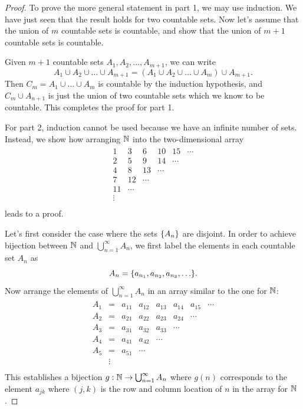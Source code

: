 \documentclass[11pt,twoside=off,numbers=noenddot]{scrbook}
\begin{document}
\begin{proof}
  To prove the more general statement in part 1, we may use
  induction. We have just seen that the result holds for two
  countable sets. Now let's assume that the union of $m$ countable
  sets is countable, and show that the union of $m + 1$ countable
  sets is countable.

  Given $m + 1$ countable sets $A_1, A_2, \dots, A_{m + 1}$, we can write
  \[ A_1 \cup A_2 \cup \dots \cup A_{m + 1} = (A_1 \cup A_2 \cup
  \dots \cup A_m) \cup A_{m + 1}. \]
  Then $C_m = A_1 \cup \dots \cup A_m$ is countable by the induction
  hypothesis, and $C_m \cup A_{n + 1}$ is just the union of two
  countable sets which we know to be countable. This completes the
  proof for part 1.

  For part 2, induction cannot be used because we have an infinite
  number of sets. Instead, we show how arranging $\mathbb N$ into the
  two-dimensional array
  \begin{align*}
    \begin{array}{cccccc}
      1  & 3  & 6  & 10 & 15 & \cdots \\
      2  & 5  & 9  & 14 & \cdots \\
      4  & 8  & 13 & \cdots \\
      7  & 12 & \cdots \\
      11 & \cdots \\
      \vdots \\
    \end{array}
  \end{align*}
  leads to a proof.

  Let's first consider the case where the sets $\{ A_n \}$ are
  disjoint. In order to achieve bijection between $\mathbb N$ and
  $\bigcup_{n = 1}^{\infty} A_n$, we first label the elements in each
  countable set $A_n$ as
  \[ A_n = \set{a_{n_1}, a_{n_2}, a_{n_3}, \dots}. \]
  Now arrange the elements of $\bigcup_{n = 1}^{\infty} A_n$ in an
  array similar to the one for $\mathbb N$:
  \begin{align*}
    \begin{array}{cccccccc}
      A_1 & =  & a_{11} & a_{12} & a_{13} & a_{14} & a_{15} & \cdots \\
      A_2 & =  & a_{21} & a_{22} & a_{23} & a_{24} & \cdots &        \\
      A_3 & =  & a_{31} & a_{32} & a_{33} & \cdots &        &        \\
      A_4 & =  & a_{41} & a_{42} & \cdots &        &        &        \\
      A_5 & =  & a_{51} & \cdots &        &        &        &        \\
      & \vdots &        &        &        &        &        &        \\
    \end{array}
  \end{align*}
  This establishes a bijection $g : \mathbb N \to \bigcup_{n = 1}^{\infty}
  A_n$ where $g(n)$ corresponds to the element $a_{jk}$ where $(j,
  k)$ is the row and column location of $n$ in the array for $\mathbb N$.


\end{proof}
\end{document}
